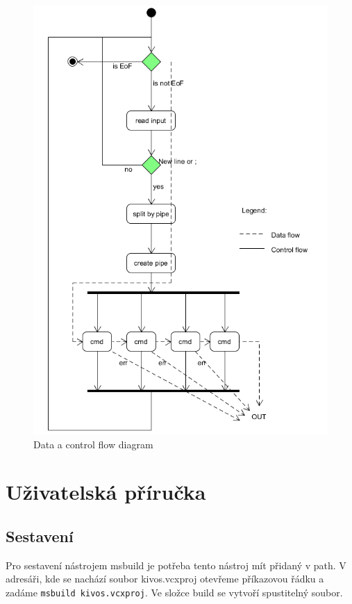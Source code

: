 \documentclass[a4paper]{article}
\begin{document}
\begin{figure}[t!] 
\centering
 \includegraphics[width=1\textwidth]{./flow2.png}
\caption{Data a control flow diagram}
\end{figure}
\pagebreak
\pagebreak
\section{Uživatelská příručka}
\subsection{Sestavení}
Pro sestavení nástrojem msbuild je potřeba tento nástroj mít přidaný v path.
V adresáři, kde se nachází soubor kivos.vcxproj otevřeme příkazovou řádku a zadáme \verb+msbuild kivos.vcxproj+. Ve složce build se vytvoří spustitelný soubor.
\end{document}
